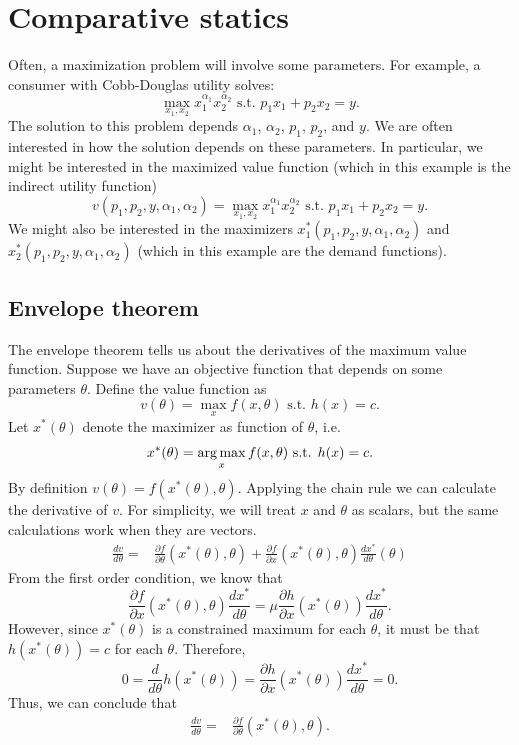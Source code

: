 \section{Comparative statics}

Often, a maximization problem will involve some parameters. For
example, a consumer with Cobb-Douglas utility solves:
\[ \max_{x_1,x_2} x_1^{\alpha_1} x_2^{\alpha_2} \text{ s.t. } p_1 x_1
+ p_2 x_2 = y. \]
The solution to this problem depends $\alpha_1$, $\alpha_2$, $p_1$,
$p_2$, and $y$. We are often interested in how the solution depends on
these parameters. In particular, we might be interested in the
maximized value function (which in this example is the indirect
utility function)
\[ v(p_1,p_2,y,\alpha_1,\alpha_2) = \max_{x_1,x_2} x_1^{\alpha_1}
x_2^{\alpha_2} \text{ s.t. } p_1 x_1 + p_2 x_2 = y. \]
We might also be interested in the maximizers
$x_1^*(p_1,p_2,y,\alpha_1,\alpha_2)$ and
$x_2^*(p_1,p_2,y,\alpha_1,\alpha_2)$ (which in this example are the
demand functions).  

\subsection{Envelope theorem}

The envelope theorem tells us about the derivatives of the maximum
value function. Suppose we have an objective function that depends on
some parameters $\theta$. Define the value function as
\[ v(\theta) = \max_x f(x,\theta) \text{ s.t. } h(x) = c. \]
Let $x^*(\theta)$ denote the maximizer as function of $\theta$, i.e. 
\[ x^*(\theta) = \argmax_x f(x,\theta) \text{ s.t. } h(x) = c. \]
By definition $v(\theta) = f(x^*(\theta), \theta)$. Applying the chain
rule we can calculate the derivative of $v$. For simplicity, we will
treat $x$ and $\theta$ as scalars, but the same calculations work when
they are vectors.
\begin{align*} 
  \frac{dv}{d\theta} = & \frac{\partial f}{\partial \theta}(x^*(\theta),\theta) +
  \frac{\partial f}{\partial x}(x^*(\theta),\theta) \frac{d x^*}{d\theta}(\theta)
\end{align*}
From the first order condition, we know that 
\[ 
\frac{\partial f}{\partial x}(x^*(\theta),\theta) \frac{dx^*}{d\theta}
= 
\mu
\frac{\partial h}{\partial x}(x^*(\theta))
\frac{dx^*}{d\theta}. 
\]
However, since $x^*(\theta)$ is a constrained maximum for each
$\theta$, it must be that $h(x^*(\theta)) = c$ for each
$\theta$. Therefore, 
\[ 0 = \frac{d}{d\theta} h(x^*(\theta)) = \frac{\partial h}{\partial
  x}(x^*(\theta)) \frac{dx^*}{d\theta} = 0. \]
Thus, we can conclude that
\begin{align*} 
  \frac{dv}{d\theta} = & \frac{\partial f}{\partial
    \theta}(x^*(\theta),\theta).
\end{align*}


